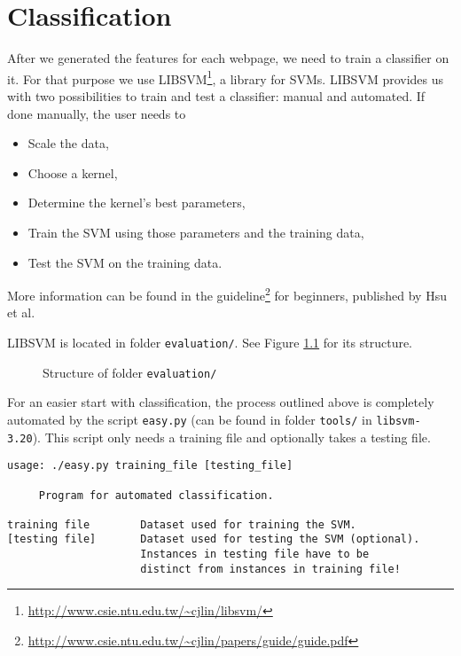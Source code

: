 \chapter{Classification}
\label{chap:classification}

After we generated the features for each webpage, we need to train a classifier on it. For that purpose we use LIBSVM\footnote{\url{http://www.csie.ntu.edu.tw/~cjlin/libsvm/}}, a library for SVMs. LIBSVM provides us with two possibilities to train and test a classifier: manual and automated. If done manually, the user needs to
\begin{itemize}
\item Scale the data,
\item Choose a kernel,
\item Determine the kernel's best parameters,
\item Train the SVM using those parameters and the training data,
\item Test the SVM on the training data.
\end{itemize}

More information can be found in the guideline\footnote{\url{http://www.csie.ntu.edu.tw/~cjlin/papers/guide/guide.pdf}} for beginners, published by Hsu et al.

LIBSVM is located in folder \texttt{evaluation/}. See Figure \ref{fig:evaluationFolder} for its structure.

\begin{figure}
\caption{Structure of folder \texttt{evaluation/} }
\label{fig:evaluationFolder}
\end{figure}

For an easier start with classification, the process outlined above is completely automated by the script \texttt{easy.py} (can be found in folder \texttt{tools/} in \texttt{libsvm-3.20}). This script only needs a training file and optionally takes a testing file. 
\begin{verbatim}
usage: ./easy.py training_file [testing_file]

     Program for automated classification.

training file        Dataset used for training the SVM.
[testing file]       Dataset used for testing the SVM (optional).
                     Instances in testing file have to be
                     distinct from instances in training file!
\end{verbatim}

